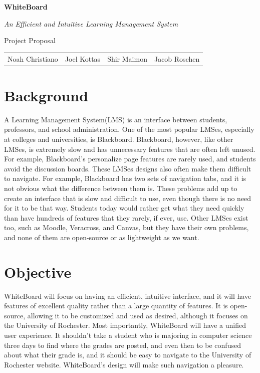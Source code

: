 \documentclass{article}
\begin{document}
\begin{center}

    \huge{\textbf{WhiteBoard}}

    \huge{\textit{An Efficient and Intuitive Learning Management System}}

    \huge{Project Proposal}

    \vspace{10 pt}

    \large{
        \begin{tabular}{cccc}
            Noah Christiano&Joel Kottas&Shir Maimon&Jacob Roschen\\
        \end{tabular}
    }

\end{center}

\vspace{10 pt}

\section{Background}

A Learning Management System(LMS) is an interface between students, professors,
and school administration. One of the most popular LMSes, especially at
colleges and universities, is Blackboard\cite{Blackboard}.  Blackboard,
however, like other LMSes, is extremely slow and has unnecessary features that
are often left unused. For example, Blackboard's personalize page features are
rarely used, and students avoid the discussion boards. These LMSes designs
also often make them difficult to navigate. For example, Blackboard has two
sets of navigation tabs, and it is not obvious what the difference between them
is. These problems add up to create an interface that is slow and difficult to
use, even though there is no need for it to be that way. Students today would
rather get what they need quickly than have hundreds of features that they
rarely, if ever, use. Other LMSes exist too, such as Moodle\cite{Moodle},
Veracross\cite{Veracross}, and Canvas\cite{Canvas}, but they have their own
problems, and none of them are open-source or as lightweight as we want.

\section{Objective}

WhiteBoard will focus on having an efficient, intuitive interface, and it will
have features of excellent quality rather than a large quantity of features. It
is open-source, allowing it to be customized and used as desired, although it
focuses on the University of Rochester. Most importantly, WhiteBoard will have
a unified user experience. It shouldn't take a student who is majoring in
computer science three days to find where the grades are posted, and even then
to be confused about what their grade is, and it should be easy to navigate to
the University of Rochester website. WhiteBoard's design will make such
navigation a pleasure.
\end{document}
